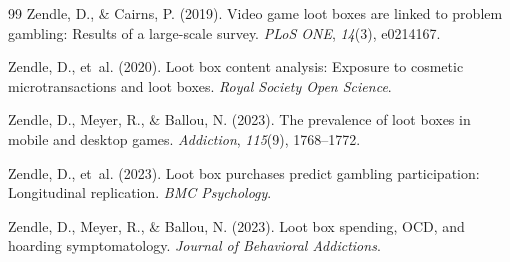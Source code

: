 \documentclass[12pt]{article}
\begin{document}
\begin{thebibliography}{99}
Zendle, D., \& Cairns, P. (2019).
\newblock Video game loot boxes are linked to problem gambling: Results of a large-scale survey.
\newblock \textit{PLoS ONE}, \textit{14}(3), e0214167.

Zendle, D., et~al. (2020).
\newblock Loot box content analysis: Exposure to cosmetic microtransactions and loot boxes.
\newblock \textit{Royal Society Open Science}.

Zendle, D., Meyer, R., \& Ballou, N. (2023).
\newblock The prevalence of loot boxes in mobile and desktop games.
\newblock \textit{Addiction}, \textit{115}(9), 1768--1772.

Zendle, D., et~al. (2023).
\newblock Loot box purchases predict gambling participation: Longitudinal replication.
\newblock \textit{BMC Psychology}.

Zendle, D., Meyer, R., \& Ballou, N. (2023).
\newblock Loot box spending, OCD, and hoarding symptomatology.
\newblock \textit{Journal of Behavioral Addictions}.

\end{thebibliography}
\end{document}
